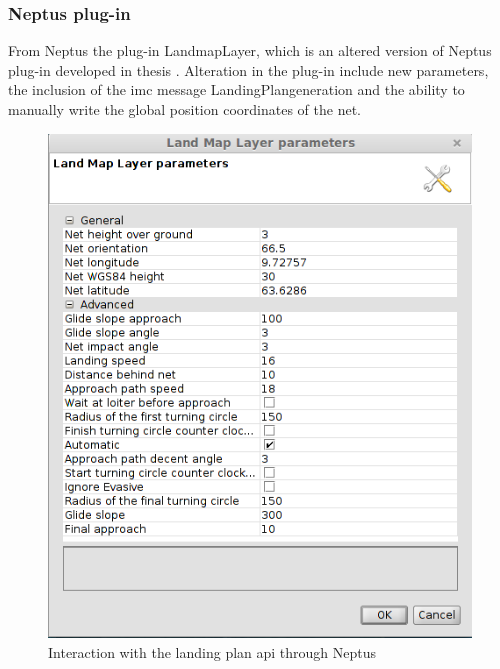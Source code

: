 \subsubsection{Neptus plug-in}
From Neptus the plug-in LandmapLayer, which is an altered version of Neptus plug-in developed in thesis \citep{Froelich}. Alteration in the plug-in include new parameters, the inclusion of the \gls{imc} message LandingPlangeneration and the ability to manually write the global position coordinates of the net.
\begin{figure}
\centering
\includegraphics[scale=0.6]{figs/LandMapLayer.png}
\caption{Interaction with the landing plan \gls{api} through Neptus}
\label{Fig:LandMapLayer}
\end{figure}
